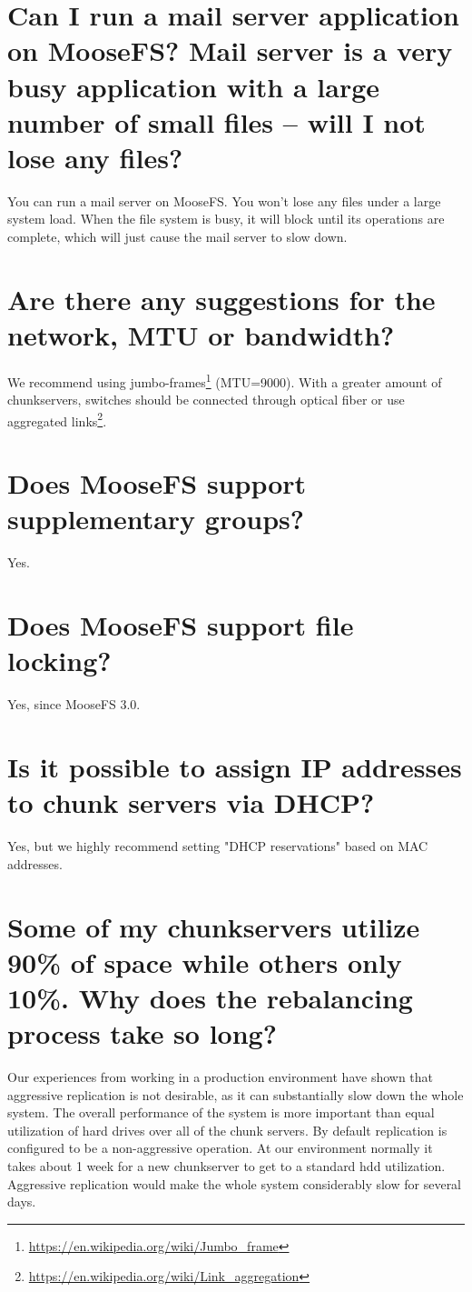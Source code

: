 \documentclass[a4paper,11pt,english]{report}
\begin{document}
		
		\section{Can I run a mail server application on MooseFS? Mail server is a very busy application with a large number of small files -- will I not lose any files?}
		You can run a mail server on MooseFS. You won't lose any files under a large system load. When the file system is busy, it will block until its operations are complete, which will just cause the mail server to slow down. 
		 
		 
		\section{Are there any suggestions for the network, MTU or bandwidth?}
		We recommend using jumbo-frames\footnote{\url{https://en.wikipedia.org/wiki/Jumbo_frame}} (MTU=9000). With a greater amount of chunkservers, switches should be connected through optical fiber or use aggregated links\footnote{\url{https://en.wikipedia.org/wiki/Link_aggregation}}.		
		
		\section{Does MooseFS support supplementary groups?}
		Yes.
		 
		\section{Does MooseFS support file locking?}
		Yes, since MooseFS 3.0.
		
		
		\section{Is it possible to assign IP addresses to chunk servers via DHCP?}
		Yes, but we highly recommend setting "DHCP reservations" based on MAC addresses.
		 
		 
		\section{Some of my chunkservers utilize 90\% of space while others only 10\%. Why does the rebalancing process take so long?}
		Our experiences from working in a production environment have shown that aggressive replication is not desirable, as it can substantially slow down the whole system. The overall performance of the system is more important than equal utilization of hard drives over all of the chunk servers. By default replication is configured to be a non-aggressive operation. At our environment normally it takes about 1 week for a new chunkserver to get to a standard hdd utilization. Aggressive replication would make the whole system considerably slow for several days.
		
\end{document}
